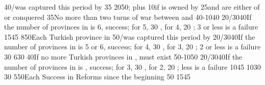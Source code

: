 %
{}{40}{\provinceOsterreich/\villeVienne was captured this period by \TUR}%
%
{}{35}{}%
%
{20}{50}{; plus 10\VPs if \provinceCyclades is owned by
  \paysmajeurTurquie}%
\EUobjective{}{\paysvalachie/\paysmoldavie}{}%
{}{25}{\paysvalachie and \paysmoldavie are either \VASSAL of \TUR or
  conquered}%
%
%
%
{}{35}{No more than two turns of war between \AUSaus and \TUR}%
%
{40-10}{40}{\EU@objPresidiosTUR}%
%
{20/30}{40}{If the number of provinces in \payscrimee is 6, success; for 5, 30
  \VPs, for 4, 20 \VPs; 3 or less is a failure}%
%
%
{15}{45}{\EU@objMonopolyZone}%
%
%
%
{8}{50}{Each Turkish province in \payshongrie}%
%
{}{50}{\provinceOsterreich/\villeVienne was captured this period by \TUR}%
%
{20/30}{40}{If the number of provinces in \payscrimee is 5 or 6, success; for
  4, 30 \VPs, for 3, 20 \VPs; 2 or less is a failure}%
%
{}{30}{}%
%
{6}{30}{\EU@objSpiceTUR}%
%
%
%
{}{40}{If no more Turkish provinces in \payshongrie, \paystransylvanie must
  exist}%
%
{50-10}{50}{\EU@objPresidiosTUR}%
%
{20/30}{40}{If the number of provinces in \payscrimee is , success; for
  3, 30 \VPs, for 2, 20 \VPs; less is a failure}%
%
{10}{45}{}%
%
{10}{30}{\EU@objSpiceTUR}%
%
%
%
{}{30}{}%
%
{5}{50}{Each Success in Reforms since the beginning}%
%
{}{50}{}%
%
{15}{45}{}%
%
